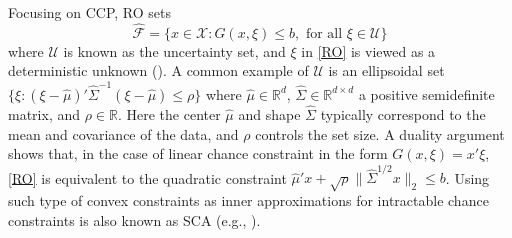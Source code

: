 \documentclass[mnsc,blindrev]{informs4} %
\begin{document}
\begin{example}\label{example:RO and SCA}
Focusing on CCP,  RO sets \begin{equation}
\hat{\mathcal F}=\{x\in\mathcal X:
   G(x,\xi)\leq b,\text{ for all }\xi\in\mathcal U\}
      \label{RO}
\end{equation}
where $\mathcal U$ is known as the uncertainty set, and $\xi$ in \eqref{RO} is viewed as a deterministic unknown (\cite{bertsimas2011theory,ben2009robust}). A common example of $\mathcal U$ is an ellipsoidal set $\{\xi:(\xi-\hat\mu)'\hat\Sigma^{-1}(\xi-\hat\mu)\leq \rho\}$ where $\hat\mu\in\mathbb R^d$, $\hat\Sigma\in\mathbb R^{d\times d}$ a positive semidefinite matrix, and $\rho\in\mathbb R$. Here the center $\hat\mu$ and shape $\hat\Sigma$ typically correspond to the mean and covariance of the data, and $\rho$ controls the set size. A duality argument shows that, in the case of linear chance constraint in the form $G(x,\xi)=x'\xi$, \eqref{RO} is equivalent to the quadratic constraint $\hat\mu'x+\sqrt \rho\|\hat\Sigma^{1/2}x\|_2\leq b$. Using such type of convex constraints as inner approximations for intractable chance constraints is also known as SCA (e.g., \cite{ben2000robust,nemirovski2003tractable,nemirovski2006convex}).


\end{example}
\end{document}
